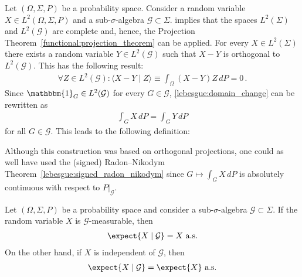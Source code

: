     Let $(\Omega,\Sigma,P)$ be a probability space. Consider a random variable $X\in L^2(\Omega,\Sigma,P)$ and a sub-$\sigma$-algebra $\mathcal{G}\subset\Sigma$.  implies that the spaces $L^2(\Sigma)$ and $L^2(\mathcal{G})$ are complete and, hence, the Projection Theorem~\ref{functional:projection_theorem} can be applied. For every $X\in L^2(\Sigma)$ there exists a random variable $Y\in L^2(\mathcal{G})$ such that $X-Y$ is orthogonal to $L^2(\mathcal{G})$. This has the following result:
    \begin{gather}
        \forall Z\in L^2(\mathcal{G}):\langle X-Y\mid Z \rangle\equiv\int_\Omega(X-Y)Z\,dP = 0\,.
    \end{gather}
    Since $\mathbbm{1}_G\in L^2(\mathcal{G})$ for every $G\in\mathcal{G}$, \cref{lebesgue:domain_change} can be rewritten as
    \begin{gather}
        \label{prob:conditional_expectation_condition}
        \int_GX\,dP = \int_GY\,dP
    \end{gather}
    for all $G\in\mathcal{G}$. This leads to the following definition:
    \begin{remark}
        Although this construction was based on orthogonal projections, one could as well have used the (signed) Radon--Nikodym Theorem~\ref{lebesgue:signed_radon_nikodym} since $G\mapsto\int_GX\,dP$ is absolutely continuous with respect to $P|_{\mathcal{G}}$.
    \end{remark}

    \begin{property}\label{prob:conditional_expectation_props}
        Let $(\Omega,\Sigma,P)$ be a probability space and consider a sub-$\sigma$-algebra $\mathcal{G}\subset\Sigma$. If the random variable $X$ is $\mathcal{G}$-measurable, then
        \begin{gather}
            \expect{X\mid\mathcal{G}} = X\text{ a.s.}
        \end{gather}
        On the other hand, if $X$ is independent of $\mathcal{G}$, then
        \begin{gather}
            \expect{X\mid\mathcal{G}} = \expect{X}\text{ a.s.}
        \end{gather}
    \end{property}

